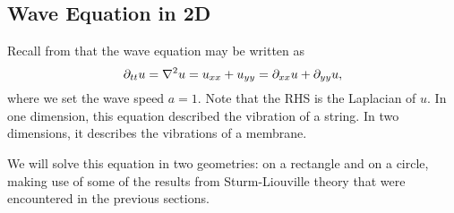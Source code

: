 \subsection{Wave Equation in 2D}\label{sec:waveeqn2d}

Recall from  that the wave equation may be written as
\begin{equation}
	\partial_{tt}u = \nabla^2u = u_{xx} + u_{yy} = \partial_{xx}u + \partial_{yy}u,
\end{equation}
where we set the wave speed $a=1$. Note that the RHS is the Laplacian of $u$. In one dimension, this equation described the vibration of a string. In two dimensions, it describes the vibrations of a membrane.

We will solve this equation in two geometries: on a rectangle and on a circle, making use of some of the results from Sturm-Liouville theory that were encountered in the previous sections.

